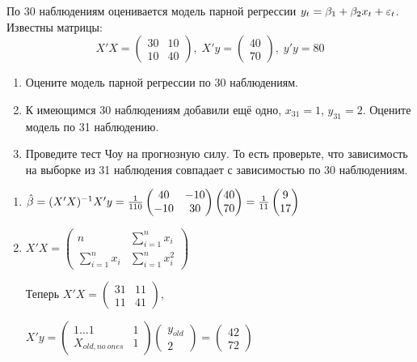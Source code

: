 \begin{problem}
По 30 наблюдениям оценивается модель парной регрессии $y_t=\beta_1 + \beta_2 x_t + \varepsilon_t$. Известны матрицы:
\[
X'X=\begin{pmatrix}
30 & 10 \\
10 & 40
\end{pmatrix}, \;
X'y=\begin{pmatrix}
40 \\
70
\end{pmatrix}, \;
y'y=80
\]

\begin{enumerate}
\item Оцените модель парной регрессии по 30 наблюдениям.
\item К имеющимся 30 наблюдениям добавили ещё одно, $x_{31}=1$, $y_{31}=2$. Оцените модель по 31 наблюдению.
\item Проведите тест Чоу на прогнозную силу. То есть проверьте, что зависимость на выборке из 31 наблюдения совпадает с зависимостью по 30 наблюдениям.
\end{enumerate}


\begin{sol}

\begin{enumerate}
\item
$\hat{\beta}=(X'X)^{-1}X'y=
\frac{1}{110}\begin{pmatrix}
40&-10\\
-10&30
\end{pmatrix}
\begin{pmatrix}
40\\
70
\end{pmatrix}=
\frac{1}{11}
\begin{pmatrix}
9\\
17
\end{pmatrix}
$

\item
$X'X=
\begin{pmatrix}
n&\sum^n_{i=1}x_i\\
\sum^n_{i=1}x_i&\sum^n_{i=1}x_i^2
\end{pmatrix} $

Теперь
$X'X=\begin{pmatrix}
31&11\\
11&41
\end{pmatrix}
$,

$X'y=\begin{pmatrix}
1\ldots 1    &1\\
X_{old, no\>ones}&1
\end{pmatrix}
\begin{pmatrix}
y_{old}\\
2
\end{pmatrix}=
\begin{pmatrix}
42\\
72
\end{pmatrix}
$


\end{enumerate}
\end{sol}
\end{problem}
